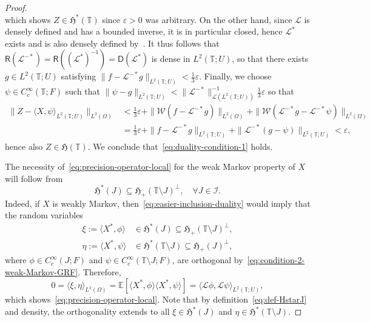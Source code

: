 \documentclass[reqno]{amsart}
\numberwithin{equation}{section}
\newcommand{\bbT}{\mathbb{T}}
\newcommand{\E}{\mathbb{E}}
\newcommand{\cL}{\mathcal{L}}
\newcommand{\norm}[2]{     \| #1       \|_{ #2 }}
\newcommand{\scalar}[2]{     \langle #1       \rangle_{ #2 }}
\newcommand{\dom}[1]{\mathsf D(#1)}
\newcommand{\range}[1]{\mathsf R(#1)}
\newcommand{\LO}{\mathscr L}
\theoremstyle{remark}
\theoremstyle{definition}
\begin{document}
\begin{proof}
\[	\]
	which shows $Z \in \mathfrak H^*(\bbT)$ since $\varepsilon > 0$ was arbitrary.
	On the other hand, 
	since $\cL$ is densely defined and has a bounded inverse, it is in particular closed,
	hence $\cL^*$ exists and is also densely defined by~\cite[Proposition~10.22]{Neerven2022}. 
	It thus follows that
	$\range{\cL^{-*}} = \range{(\cL^*)^{-1}} = \dom{\cL^*}$ is dense in $L^2(\bbT; U)$,
	so that there exists $g \in L^2(\bbT; U)$ satisfying
	$\norm{f - \cL^{-*}g}{L^2(\bbT; U)} < \frac{1}{3}\varepsilon$. Finally,
	we choose $\psi \in C_c^\infty(\bbT; F)$ such that
	$\norm{\psi - g}{L^2(\bbT; U)} < \norm{\cL^{-*}}{\LO(L^2(\bbT;U))}^{-1} \frac{1}{3} \varepsilon$ so that
	\[
	\begin{aligned}
		\norm{Z - \scalar{X, \psi}{L^2(\bbT;U)}}{L^2(\Omega)}
		&<
		\tfrac{1}{3}\varepsilon
		+
		\norm{\mathscr W(f - \cL^{-*}g)}{L^2(\Omega)}
		+
		\norm{\mathscr W(\cL^{-*}g - \cL^{-*} \psi)}{L^2(\Omega)}
		\\&=
		\tfrac{1}{3}\varepsilon
		+
		\norm{f - \cL^{-*}g}{L^2(\bbT;U)}
		+
		\norm{\cL^{-*}(g - \psi)}{L^2(\bbT;U)} < \varepsilon,
	\end{aligned}
	\]
	hence also $Z \in \mathfrak H(\bbT)$. 
	We conclude that~\eqref{eq:duality-condition-1} holds.
	
	The necessity of~\eqref{eq:precision-operator-local} for the weak Markov property
	of $X$ will follow from
	\begin{equation}\label{eq:easier-inclusion-duality}
		\mathfrak H^*(J) \subseteq \mathfrak H_+(\bbT \setminus J)^\perp, \quad \forall J \in \mathscr I.
	\end{equation}
	Indeed, if $X$ is weakly Markov, then~\eqref{eq:easier-inclusion-duality}
	would imply that the random variables
	\[
	\begin{aligned}
		\xi := \langle X^*, \phi \rangle &\in \mathfrak H^*(J) \subseteq \mathfrak H_+(\bbT\setminus J)^\perp,
		\\
		\eta := \langle X^*, \psi \rangle &\in \mathfrak H^*(\bbT \setminus J) \subseteq \mathfrak H_+(J)^\perp,
	\end{aligned}
	\]
	where $\phi \in C_c^\infty(J; F)$ and $\psi \in C_c^\infty(\bbT\setminus J; F)$,
	are orthogonal by~\eqref{eq:condition-2-weak-Markov-GRF}.
	Therefore,
	\[
	0 = \scalar{\xi, \eta}{L^2(\Omega)}
	=
	\E[\langle X^*, \phi \rangle \langle X^*, \psi \rangle]
	=
	\scalar{\cL \phi, \cL \psi }{L^2(\bbT; U)},
	\]
	which shows~\eqref{eq:precision-operator-local}.
	Note that by definition~\eqref{eq:def-HstarJ} and density, the orthogonality extends to all $\xi \in \mathfrak H^*(J)$
	and $\eta \in \mathfrak H^*(\bbT\setminus J)$.
	

\end{proof}
\end{document}
